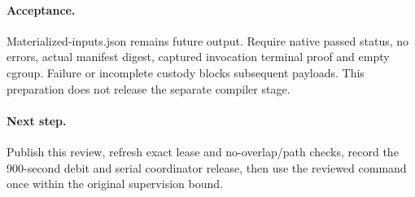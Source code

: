 \documentclass[10pt]{article}
\begin{document}
\paragraph{Acceptance.} Materialized-inputs.json remains future output. Require native passed status, no errors, actual manifest digest, captured invocation terminal proof and empty cgroup. Failure or incomplete custody blocks subsequent payloads. This preparation does not release the separate compiler stage.
\paragraph{Next step.} Publish this review, refresh exact lease and no-overlap/path checks, record the 900-second debit and serial coordinator release, then use the reviewed command once within the original supervision bound.
\end{document}
